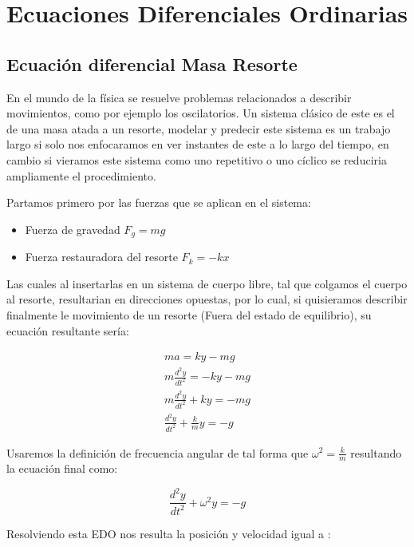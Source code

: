 \chapter{Ecuaciones Diferenciales Ordinarias}

\section{Ecuación diferencial Masa Resorte}

En el mundo de la física se resuelve problemas relacionados a describir movimientos, como por ejemplo los oscilatorios. Un sistema clásico de este es el de una masa atada a un resorte, modelar y predecir este sistema es un trabajo largo si solo nos enfocaramos en ver instantes de este a lo largo del tiempo, en cambio si vieramos este sistema como uno repetitivo o uno cíclico se reduciria ampliamente el procedimiento.

Partamos primero por las fuerzas que se aplican en el sistema:

\begin{itemize}
    \item Fuerza de gravedad $F_{g}= mg$
    \item Fuerza restauradora del resorte $F_{k}=-kx$
\end{itemize}

Las cuales al insertarlas en un sistema de cuerpo libre, tal que colgamos el cuerpo al resorte, resultarian en direcciones opuestas, por lo cual, si quisieramos describir finalmente le movimiento de un resorte (Fuera del estado de equilibrio), su ecuación resultante sería:

\begin{align}
    ma = ky - mg  \nonumber\\
    m \frac{d^2 y}{dt^2} = - ky - mg \nonumber \\
    m \frac{d^2 y}{dt^2} + ky = -mg  \nonumber \\
    \frac{d^2 y}{dt^2} + \frac{k}{m} y = -g \nonumber
\end{align}

Usaremos la definición de frecuencia angular de tal forma que $\omega^2 = \frac{k}{m}$ resultando la ecuación final como:

\begin{equation}
    \frac{d^2 y}{dt^2} + \omega^2 y =-g \nonumber
\end{equation}

Resolviendo esta EDO nos resulta la posición y velocidad igual a :


